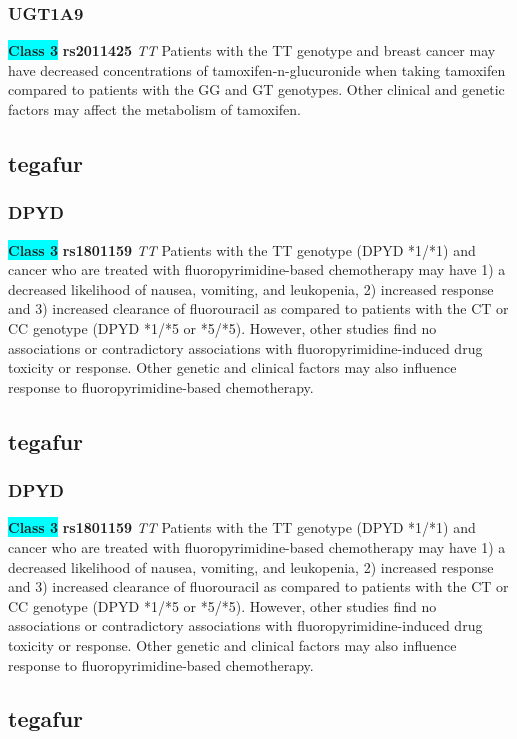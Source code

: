 \documentclass{book}
\begin{document}
\subsubsection{ UGT1A9 }

\begin{center}
\textbf{\colorbox{cyan} {Class 3}} \textbf{ rs2011425 } \textit{ TT }
Patients with the TT genotype and breast cancer may have decreased concentrations of tamoxifen-n-glucuronide when taking tamoxifen compared to patients with the GG and GT genotypes. Other clinical and genetic factors may affect the metabolism of tamoxifen.


\end{center}\subsection{ tegafur }


\subsubsection{ DPYD }

\begin{center}
\textbf{\colorbox{cyan} {Class 3}} \textbf{ rs1801159 } \textit{ TT }
Patients with the TT genotype (DPYD *1/*1) and cancer who are treated with fluoropyrimidine-based chemotherapy may have 1) a decreased likelihood of nausea, vomiting, and leukopenia, 2) increased response and 3) increased clearance of fluorouracil as compared to patients with the CT or CC genotype (DPYD *1/*5 or *5/*5). However, other studies find no associations or contradictory associations with fluoropyrimidine-induced drug toxicity or response. Other genetic and clinical factors may also influence response to fluoropyrimidine-based chemotherapy.


\end{center}\subsection{ tegafur }


\subsubsection{ DPYD }

\begin{center}
\textbf{\colorbox{cyan} {Class 3}} \textbf{ rs1801159 } \textit{ TT }
Patients with the TT genotype (DPYD *1/*1) and cancer who are treated with fluoropyrimidine-based chemotherapy may have 1) a decreased likelihood of nausea, vomiting, and leukopenia, 2) increased response and 3) increased clearance of fluorouracil as compared to patients with the CT or CC genotype (DPYD *1/*5 or *5/*5). However, other studies find no associations or contradictory associations with fluoropyrimidine-induced drug toxicity or response. Other genetic and clinical factors may also influence response to fluoropyrimidine-based chemotherapy.


\end{center}\subsection{ tegafur }
\end{document}
